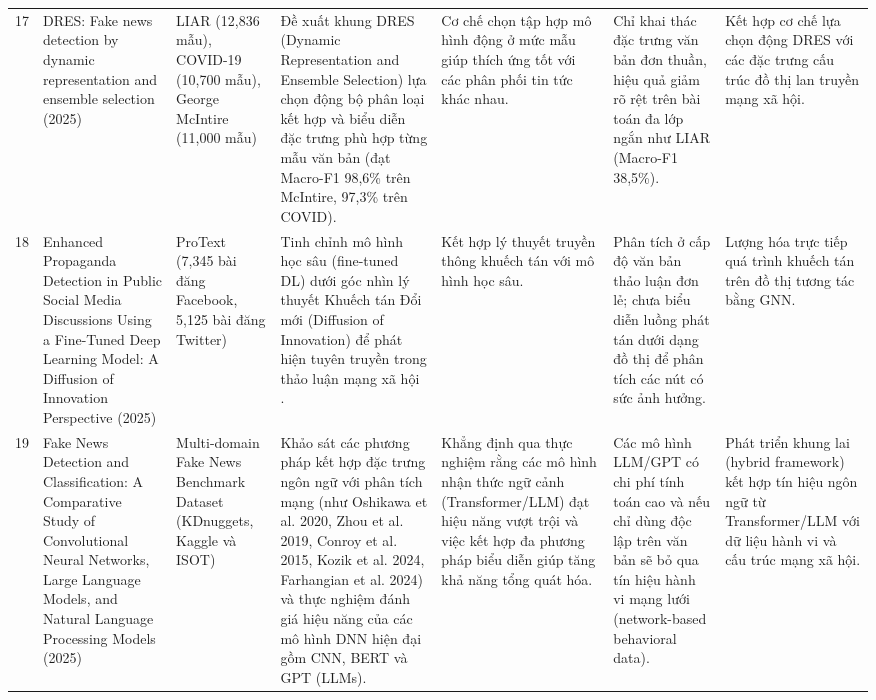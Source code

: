 \documentclass[11pt,a4paper]{extreport}
\begin{document}
\begin{landscape}
\begin{longtable}{@{}C{0.6cm}p{3.6cm}p{2.7cm}p{4.8cm}p{3.6cm}p{3.6cm}p{3.6cm}@{}}
17 & DRES: Fake news detection by dynamic representation and ensemble selection (2025) \cite{noauthor_dres_2025} & LIAR (12,836 mẫu), COVID-19 (10,700 mẫu), George McIntire (11,000 mẫu) & Đề xuất khung DRES (Dynamic Representation and Ensemble Selection) lựa chọn động bộ phân loại kết hợp và biểu diễn đặc trưng phù hợp từng mẫu văn bản (đạt Macro-F1 98,6\% trên McIntire, 97,3\% trên COVID). & Cơ chế chọn tập hợp mô hình động ở mức mẫu giúp thích ứng tốt với các phân phối tin tức khác nhau. & Chỉ khai thác đặc trưng văn bản đơn thuần, hiệu quả giảm rõ rệt trên bài toán đa lớp ngắn như LIAR (Macro-F1 38,5\%). & Kết hợp cơ chế lựa chọn động DRES với các đặc trưng cấu trúc đồ thị lan truyền mạng xã hội. \\ 

18 & Enhanced Propaganda Detection in Public Social Media Discussions Using a Fine-Tuned Deep Learning Model: A Diffusion of Innovation Perspective (2025) \cite{noauthor_enhanced_2025} & ProText (7,345 bài đăng Facebook, 5,125 bài đăng Twitter) & Tinh chỉnh mô hình học sâu (fine-tuned DL) dưới góc nhìn lý thuyết Khuếch tán Đổi mới (Diffusion of Innovation) để phát hiện tuyên truyền trong thảo luận mạng xã hội \cite{noauthor_enhanced_2025}. & Kết hợp lý thuyết truyền thông khuếch tán với mô hình học sâu. & Phân tích ở cấp độ văn bản thảo luận đơn lẻ; chưa biểu diễn luồng phát tán dưới dạng đồ thị để phân tích các nút có sức ảnh hưởng. & Lượng hóa trực tiếp quá trình khuếch tán trên đồ thị tương tác bằng GNN. \\ 

19 & Fake News Detection and Classification: A Comparative Study of Convolutional Neural Networks, Large Language Models, and Natural Language Processing Models (2025) \cite{noauthor_fake_2025} & Multi-domain Fake News Benchmark Dataset (KDnuggets, Kaggle và ISOT) & Khảo sát các phương pháp kết hợp đặc trưng ngôn ngữ với phân tích mạng (như Oshikawa et al. 2020, Zhou et al. 2019, Conroy et al. 2015, Kozik et al. 2024, Farhangian et al. 2024) và thực nghiệm đánh giá hiệu năng của các mô hình DNN hiện đại gồm CNN, BERT và GPT (LLMs). & Khẳng định qua thực nghiệm rằng các mô hình nhận thức ngữ cảnh (Transformer/LLM) đạt hiệu năng vượt trội và việc kết hợp đa phương pháp biểu diễn giúp tăng khả năng tổng quát hóa. & Các mô hình LLM/GPT có chi phí tính toán cao và nếu chỉ dùng độc lập trên văn bản sẽ bỏ qua tín hiệu hành vi mạng lưới (network-based behavioral data). & Phát triển khung lai (hybrid framework) kết hợp tín hiệu ngôn ngữ từ Transformer/LLM với dữ liệu hành vi và cấu trúc mạng xã hội. \\ 


\end{longtable}
\end{landscape}
\end{document}
